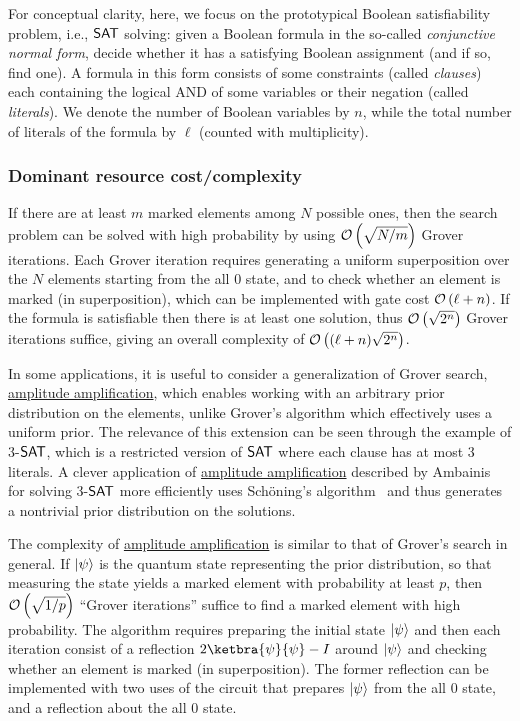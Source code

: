 \begin{refsection}
	For conceptual clarity, here, we focus on the prototypical Boolean satisfiability problem, i.e., $\mathsf{SAT}$ solving: given a Boolean formula in the so-called \emph{conjunctive normal form}, decide whether it has a satisfying Boolean assignment (and if so, find one). A formula in this form consists of some constraints (called \emph{clauses}) each containing the logical AND of some variables or their negation (called \emph{literals}). We denote the number of Boolean variables by $n$, while the total number of literals of the formula by $\ell$ (counted with multiplicity).
		
			
	
	\subsubsection*{Dominant resource cost/complexity}
	If there are at least $m$ marked elements among $N$ possible ones, then the search problem can be solved with high probability by using $\mathcal{O}\left( \sqrt{N/m} \right)$ Grover iterations. Each Grover iteration requires generating a uniform superposition over the $N$ elements starting from the all $0$ state, and to check whether an element is marked (in superposition), which can be implemented with gate cost $\mathcal{O}\left( \ell+n \right)$. If the formula is satisfiable then there is at least one solution, thus $\mathcal{O}\left( \sqrt{2^n} \right)$ Grover iterations suffice, giving an overall complexity of $\mathcal{O}\left( (\ell+n)\sqrt{2^n} \right)$.
	
	In some applications, it is useful to consider a generalization of Grover search, \hyperref[prim:AmpAmp]{amplitude amplification}, which enables working with an arbitrary prior distribution on the elements, unlike Grover's algorithm which effectively uses a uniform prior. 
	The relevance of this extension can be seen through the example of 3-$\mathsf{SAT}$, which is a restricted version of $\mathsf{SAT}$ where each clause has at most 3 literals. A clever application of \hyperref[prim:AmpAmp]{amplitude amplification} described by Ambainis~\cite{ambainis2004QSearchAlgos} for solving 3-$\mathsf{SAT}$ more efficiently uses Schöning's algorithm~\cite{schoning1999ProbAlgForkSAT} and thus generates a nontrivial prior distribution on the solutions. 
	
    The complexity of \hyperref[prim:AmpAmp]{amplitude amplification} is similar to that of Grover's search in general. If $\lvert\psi\rangle$ is the quantum state representing the prior distribution, so that measuring the state yields a marked element with probability at least $p$, then $\mathcal{O}\left( \sqrt{1/p} \right)$ ``Grover iterations'' suffice to find a marked element with high probability. The algorithm requires preparing the initial state $\lvert\psi\rangle$ and then each iteration consist of a reflection $2\ketbra{\psi}{\psi}-I$ around $\lvert\psi\rangle$ and checking whether an element is marked (in superposition). The former reflection can be implemented with two uses of the circuit that prepares $\lvert\psi\rangle$ from the all $0$ state, and a reflection about the all $0$ state.
	

\end{refsection}
